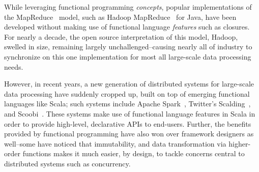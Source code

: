 \documentclass{jfp1}
\begin{document}
While leveraging functional programming {\em concepts}, popular implementations
of the MapReduce~\cite{MapReduce} model, such as Hadoop MapReduce~\cite{Hadoop}
for Java, have been developed without making use of functional language {\em
features} such as closures. For nearly a decade, the open source interpretation
of this model, Hadoop, swelled in size, remaining largely unchallenged--causing
nearly all of industry to synchronize on this one implementation for most all
large-scale data processing needs.

However, in recent years, a new generation of distributed systems for
large-scale data processing have suddenly cropped up, built on top of emerging
functional languages like Scala; such systems include Apache Spark~\cite{Spark},
Twitter's Scalding~\cite{Scalding}, and Scoobi~\cite{Scoobi}. These systems make
use of functional language features in Scala in order to provide high-level,
declarative APIs to end-users. Further, the benefits provided by functional
programming have also won over framework designers as well--some have noticed
that immutability, and data transformation via higher-order functions makes it
much easier, by design, to tackle concerns central to distributed systems such
as concurrency.


%
%
%
%
\end{document}
